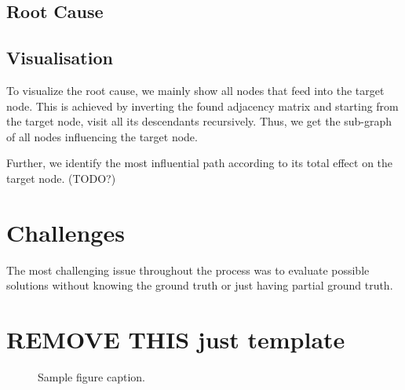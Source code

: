 \documentclass{article}
\begin{document}
    \subsection{Root Cause}
    
    
    
    \subsection{Visualisation}

    To visualize the root cause, we mainly show all nodes that feed into the target node. This is achieved by inverting the found adjacency matrix and starting from the target node, visit all its descendants recursively. Thus, we get the sub-graph of all nodes influencing the target node. 

    Further, we identify the most influential path according to its total effect on the target node. (TODO?) 
    
    
    \section{Challenges} %
    The most challenging issue throughout the process was to evaluate possible solutions without knowing the ground truth or just having partial ground truth.

    \section{REMOVE THIS just template}
	
	\begin{figure}
		\centering
		\fbox{\rule[-.5cm]{0cm}{4cm} \rule[-.5cm]{4cm}{0cm}}
		\caption{Sample figure caption.}
	\end{figure}
	
	
	
	
	
	
	
	
	
	
	
	\printbibliography %
	
	
\end{document}
